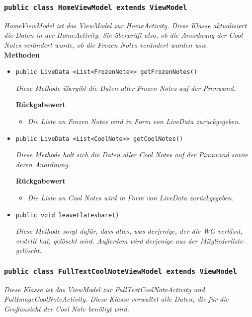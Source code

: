              
             
            		\subsubsection{\texttt{public class HomeViewModel extends ViewModel}}
        \textit{HomeViewModel ist das ViewModel zur HomeActivity. Diese Klasse aktualisiert die Daten in der HomeActivity. Sie überprüft also, ob die Anordnung der Cool Notes verändert wurde, ob die Frozen Notes verändert wurden usw.}\\   
        
		\textbf{Methoden}
 			\begin{itemize}
        		\item{\texttt{public LiveData <List<FrozenNote>> getFrozenNotes()}}
        	
        		\textit{Diese Methode übergibt die Daten aller Frozen Notes auf der Pinnwand.}
        
        		\textbf{Rückgabewert}
        		\begin{itemize}
        			\item\textit{Die Liste an Frozen Notes wird in Form von LiveData zurückgegeben.}
        		\end{itemize}
        	
        		\item{\texttt{public LiveData <List<CoolNote>> getCoolNotes()}}

        		\textit{Diese Methode holt sich die Daten aller Cool Notes auf der Pinnwand sowie deren Anordnung.}
        		
        	\textbf{Rückgabewert}
        	\begin{itemize}
        		\item\textit{Die Liste an Cool Notes wird in Form von LiveData zurückgegeben.}
			\end{itemize}	
	
			\item{\texttt{public void leaveFlateshare()}}
			
			\textit{Diese Methode sorgt dafür, dass alles, was derjenige, der die WG verlässt, erstellt hat, gelöscht wird. Außerdem wird derjenige aus der Mitgliederliste gelöscht.}
		
		\end{itemize}
        		
             
           		\subsubsection{\texttt{public class FullTextCoolNoteViewModel extends ViewModel}}
        \textit{Diese Klasse ist das ViewModel zur FullTextCoolNoteActivity und FullImageCoolNoteActivity. Diese Klasse verwaltet alle Daten, die für die Großansicht der Cool Note benötigt wird.}\\
        
